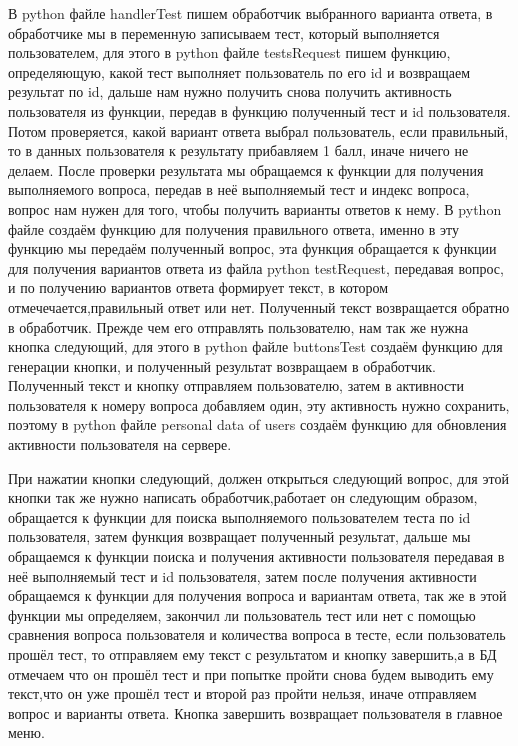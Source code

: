 \documentclass[12pt, oldlfont, amsfonts]{report}
\begin{document}
В python файле { handlerTest} пишем обработчик выбранного варианта ответа, в обработчике мы в переменную записываем тест, который выполняется пользователем, для этого в python файле { testsRequest} пишем функцию, определяющую, какой тест выполняет пользователь по его { id} и возвращаем результат по id, дальше нам нужно получить снова получить активность пользователя из функции, передав в функцию полученный тест и { id} пользователя. Потом проверяется, какой вариант ответа выбрал пользователь, если правильный, то в данных пользователя к результату прибавляем 1 балл, иначе ничего не делаем. После проверки результата мы обращаемся к функции для получения выполняемого вопроса, передав в неё выполняемый тест и индекс вопроса, вопрос нам нужен для того, чтобы получить варианты ответов к нему. В python файле создаём функцию для получения правильного ответа, именно в эту функцию мы передаём полученный вопрос, эта функция обращается к функции для получения вариантов ответа из файла python { testRequest}, передавая вопрос, и по получению вариантов ответа формирует текст, в котором отмечечается,правильный ответ или нет. Полученный текст возвращается обратно в обработчик. Прежде чем его отправлять пользователю, нам так же нужна кнопка { следующий}, для этого в python файле { buttonsTest} создаём функцию для генерации кнопки, и полученный результат возвращаем в обработчик. Полученный текст и кнопку отправляем пользователю, затем в активности пользователя к номеру вопроса добавляем один, эту активность нужно сохранить, поэтому в python файле { personal data of users} создаём функцию для обновления активности пользователя на сервере.

При нажатии кнопки следующий, должен открыться следующий вопрос, для этой кнопки так же нужно написать обработчик,работает он следующим образом, обращается к функции для поиска выполняемого пользователем теста по { id} пользователя, затем функция возвращает полученный результат, дальше мы обращаемся к функции поиска и получения активности пользователя передавая в неё выполняемый тест и id пользователя, затем после получения активности обращаемся к функции для получения вопроса и вариантам ответа, так же в этой функции мы определяем, закончил ли пользователь тест или нет с помощью сравнения вопроса пользователя и количества вопроса в тесте, если пользователь прошёл тест, то отправляем ему текст с результатом и кнопку завершить,а в БД отмечаем что он прошёл тест и при попытке пройти снова будем выводить ему текст,что он уже прошёл тест и второй раз пройти нельзя, иначе отправляем вопрос и варианты ответа. Кнопка завершить возвращает пользователя в главное меню.
\end{document}
